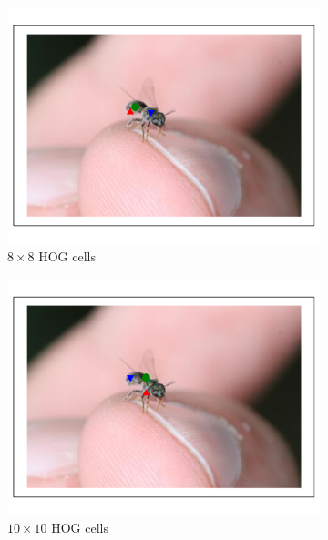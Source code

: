 \documentclass[11pt, oneside]{report}
\begin{document}
\begin{figure}[p]
\begin{subfigure}[b]{0.3\textwidth}
                \includegraphics[width=\textwidth]{hog8_2.pdf}
                \caption{$8\times8$ HOG cells}
            \end{subfigure}
            \begin{subfigure}[b]{0.3\textwidth}
                \centering
                \includegraphics[width=\textwidth]{hog10_2.pdf}
                \caption{$10\times10$ HOG cells}
            \end{subfigure}
            \begin{subfigure}[b]{0.3\textwidth}
                \centering

\end{subfigure}
\end{figure}
\end{document}
